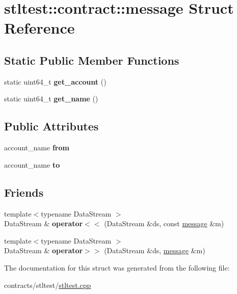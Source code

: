 \hypertarget{structstltest_1_1contract_1_1message}{}\section{stltest\+:\+:contract\+:\+:message Struct Reference}
\label{structstltest_1_1contract_1_1message}
\subsection*{Static Public Member Functions}
\begin{DoxyCompactItemize}
\item 
\mbox{\label{structstltest_1_1contract_1_1message_a97cbf3456ff972d0fe6dc1cf8a840955}} 
static uint64\+\_\+t {\bfseries get\+\_\+account} ()
\item 
\mbox{\label{structstltest_1_1contract_1_1message_ac04aa13cafd0fe68b4987c35f924074d}} 
static uint64\+\_\+t {\bfseries get\+\_\+name} ()
\end{DoxyCompactItemize}
\subsection*{Public Attributes}
\begin{DoxyCompactItemize}
\item 
\mbox{\label{structstltest_1_1contract_1_1message_a4b517a8cd1ce7d316d4db520ecfda16d}} 
account\+\_\+name {\bfseries from}
\item 
\mbox{\label{structstltest_1_1contract_1_1message_a131fd250cf64cb06902ef9fa972f5846}} 
account\+\_\+name {\bfseries to}
\end{DoxyCompactItemize}
\subsection*{Friends}
\begin{DoxyCompactItemize}
\item 
\mbox{\label{structstltest_1_1contract_1_1message_ab96ec75ae22a3e52ad626c0d8c24b07e}} 
{\footnotesize template$<$typename Data\+Stream $>$ }\\Data\+Stream \& {\bfseries operator$<$$<$} (Data\+Stream \&ds, const \mbox{\hyperlink{structstltest_1_1contract_1_1message}{message}} \&m)
\item 
\mbox{\label{structstltest_1_1contract_1_1message_a0ef9f08e8c71cca7f0a5b39c59ed71c0}} 
{\footnotesize template$<$typename Data\+Stream $>$ }\\Data\+Stream \& {\bfseries operator$>$$>$} (Data\+Stream \&ds, \mbox{\hyperlink{structstltest_1_1contract_1_1message}{message}} \&m)
\end{DoxyCompactItemize}


The documentation for this struct was generated from the following file\+:\begin{DoxyCompactItemize}
\item 
contracts/stltest/\mbox{\hyperlink{stltest_8cpp}{stltest.\+cpp}}\end{DoxyCompactItemize}

